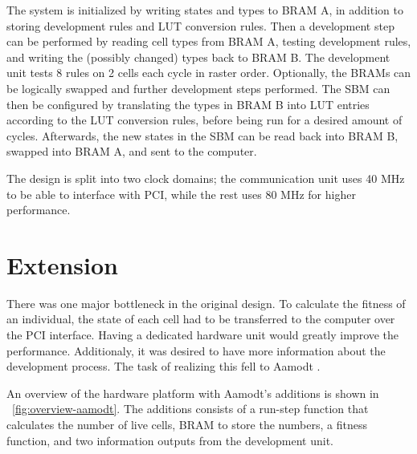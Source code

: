 The system is initialized by writing states and types to BRAM A, in addition to storing development rules and LUT conversion rules.
Then a development step can be performed by reading cell types from BRAM A\footnotemark, testing development rules, and writing the (possibly changed) types back to BRAM B.
The development unit tests 8 rules on 2 cells each cycle in raster order.
Optionally, the BRAMs can be logically swapped and further development steps performed.
The SBM can then be configured by translating the types in BRAM B into LUT entries according to the LUT conversion rules, before being run for a desired amount of cycles.
Afterwards, the new states in the SBM can be read back into BRAM B, swapped into BRAM A, and sent to the computer.

The design is split into two clock domains; the communication unit uses 40 MHz to be able to interface with PCI, while the rest uses 80 MHz for higher performance.

\section{Extension}

There was one major bottleneck in the original design.
To calculate the fitness of an individual, the state of each cell had to be transferred to the computer over the PCI interface.
Having a dedicated hardware unit would greatly improve the performance.
Additionaly, it was desired to have more information about the development process.
The task of realizing this fell to Aamodt \cite{aamodt2005sblock}.

An overview of the hardware platform with Aamodt's additions is shown in \figurename~\ref{fig:overview-aamodt}.
The additions consists of a run-step function that calculates the number of live cells, BRAM to store the numbers, a fitness function, and two information outputs from the development unit.

